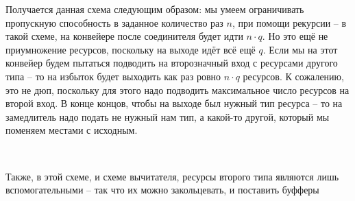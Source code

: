 \vspace{0.5in}

Получается данная схема следующим образом: мы умеем ограничивать пропускную способность в заданное количество раз $n$, при помощи рекурсии -- в такой схеме, на конвейере после соединителя будет идти $n\cdot q$. Но это ещё не приумножение ресурсов, поскольку на выходе идёт всё ещё $q$. Если мы на этот конвейер будем пытаться подводить на второзначный вход с ресурсами другого типа -- то на избыток будет выходить как раз ровно $n \cdot q$ ресурсов. К сожалению, это не дюп, поскольку для этого надо подводить максимальное число ресурсов на второй вход. В конце концов, чтобы на выходе был нужный тип ресурса -- то на замедлитель надо подать не нужный нам тип, а какой-то другой, который мы поменяем местами с исходным.

\

Также, в этой схеме, и схеме вычитателя, ресурсы второго типа являются лишь вспомогательными -- так что их можно закольцевать, и поставить буфферы








\vspace{0.5in}

